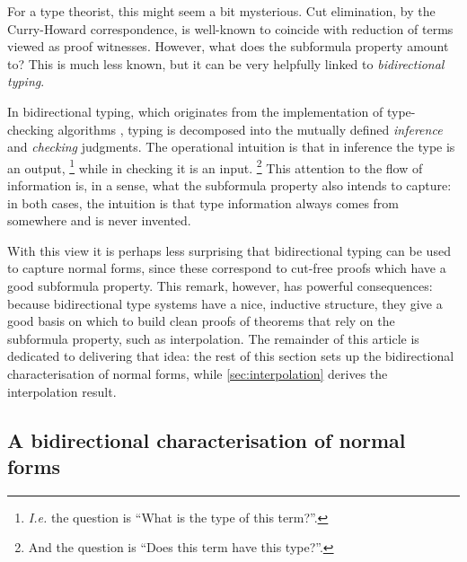 \documentclass[a4paper,UKenglish,cleveref, autoref, thm-restate]{lipics-v2021}
\begin{document}
For a type theorist, this might seem a bit mysterious. Cut elimination, by
the Curry-Howard correspondence, is well-known to coincide with reduction of
terms viewed as proof witnesses. However, what does the subformula property
amount to? This is much less known, but it can be very helpfully linked to
\emph{bidirectional typing}.

In bidirectional typing,
which originates from the implementation of type-checking algorithms \cite{Coquand1996,Pierce2000},
typing is decomposed into the mutually defined
\emph{inference} and \emph{checking} judgments. The operational intuition is
that in inference the type is an output,%
\footnote{\textit{I.e.} the question is ``What is the type of this term?''.}
while in checking it is an input.%
\footnote{And the question is ``Does this term have this type?''.}
This attention to the flow of information is, in a sense, what
the subformula property also intends to capture: in both cases, the intuition
is that type information always comes from somewhere and is never invented.

With this view it is perhaps less surprising that bidirectional
typing can be used to capture normal forms, since
these correspond to cut-free proofs which have a good
subformula property. This remark, however, has powerful consequences:
because bidirectional type systems have a nice, inductive structure, they
give a good basis on which to build clean proofs of theorems that rely on
the subformula property, such as interpolation. The remainder of this article
is dedicated to delivering that idea: the rest of this section sets up the
bidirectional characterisation of normal forms, while \cref{sec:interpolation}
derives the interpolation result.

\subsection{A bidirectional characterisation of normal forms}
\end{document}
